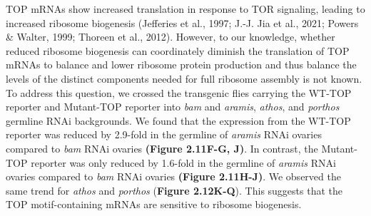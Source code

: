 \documentclass[12pt,oneside]{reedthesis}
\begin{document}
\setlength\parindent{24pt}

\textbf{\hfill\break
}

TOP mRNAs show increased translation in response to TOR signaling, leading to increased ribosome biogenesis (Jefferies et al., 1997; J.-J. Jia et al., 2021; Powers \& Walter, 1999; Thoreen et al., 2012). However, to our knowledge, whether reduced ribosome biogenesis can coordinately diminish the translation of TOP mRNAs to balance and lower ribosome protein production and thus balance the levels of the distinct components needed for full ribosome assembly is not known. To address this question, we crossed the transgenic flies carrying the WT-TOP reporter and Mutant-TOP reporter into \emph{bam} and \emph{aramis}, \emph{athos}, and \emph{porthos} germline RNAi backgrounds. We found that the expression from the WT-TOP reporter was reduced by 2.9-fold in the germline of \emph{aramis} RNAi ovaries compared to \emph{bam} RNAi ovaries \textbf{(Figure 2.11F-G, J)}. In contrast, the Mutant-TOP reporter was only reduced by 1.6-fold in the germline of \emph{aramis} RNAi ovaries compared to \emph{bam} RNAi ovaries \textbf{(Figure 2.11H-J)}. We observed the same trend for \emph{athos} and \emph{porthos} (\textbf{Figure 2.12K-Q}). This suggests that the TOP motif-containing mRNAs are sensitive to ribosome biogenesis.
\end{document}
